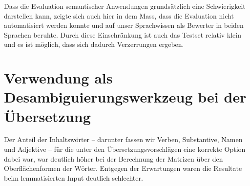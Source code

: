 \documentclass[11pt,twoside,openright]{mpreport}
\begin{document}
Dass die Evaluation semantischer Anwendungen grundsätzlich eine Schwierigkeit darstellen kann, zeigte sich auch hier in dem Mass, dass die Evaluation nicht automatisiert werden konnte und auf unser Sprachwissen als Bewerter in beiden Sprachen beruhte. Durch diese Einschränkung ist auch das Testset relativ klein und es ist möglich, dass sich dadurch Verzerrungen ergeben.

\section{Verwendung als Desambiguierungswerkzeug bei der Übersetzung}
Der Anteil der Inhaltswörter -- darunter fassen wir Verben, Substantive, Namen und Adjektive -- für die unter den Übersetzungsvorschlägen eine korrekte Option dabei war, war deutlich höher bei der Berechnung der Matrizen über den Oberflächenformen der Wörter. Entgegen der Erwartungen waren die Resultate beim lemmatisierten Input deutlich schlechter.
\end{document}
